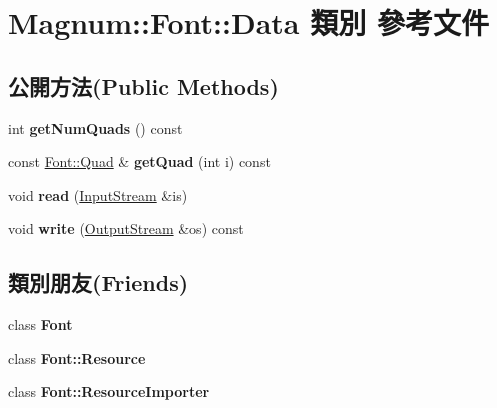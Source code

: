 \hypertarget{class_magnum_1_1_font_1_1_data}{}\section{Magnum\+:\+:Font\+:\+:Data 類別 參考文件}
\label{class_magnum_1_1_font_1_1_data}
\subsection*{公開方法(Public Methods)}
\begin{DoxyCompactItemize}
\item 
int {\bfseries get\+Num\+Quads} () const \hypertarget{class_magnum_1_1_font_1_1_data_a4d13c583437adea6462846e051424389}{}\label{class_magnum_1_1_font_1_1_data_a4d13c583437adea6462846e051424389}

\item 
const \hyperlink{class_magnum_1_1_font_1_1_quad}{Font\+::\+Quad} \& {\bfseries get\+Quad} (int i) const \hypertarget{class_magnum_1_1_font_1_1_data_a6fd9fd60bfb655331a77222a184983fe}{}\label{class_magnum_1_1_font_1_1_data_a6fd9fd60bfb655331a77222a184983fe}

\item 
void {\bfseries read} (\hyperlink{class_magnum_1_1_input_stream}{Input\+Stream} \&is)\hypertarget{class_magnum_1_1_font_1_1_data_a6b1fcfa12684b6bef6709dc16d1c0c77}{}\label{class_magnum_1_1_font_1_1_data_a6b1fcfa12684b6bef6709dc16d1c0c77}

\item 
void {\bfseries write} (\hyperlink{class_magnum_1_1_output_stream}{Output\+Stream} \&os) const \hypertarget{class_magnum_1_1_font_1_1_data_a6bd8d434323ba4560a117d608f63fb43}{}\label{class_magnum_1_1_font_1_1_data_a6bd8d434323ba4560a117d608f63fb43}

\end{DoxyCompactItemize}
\subsection*{類別朋友(Friends)}
\begin{DoxyCompactItemize}
\item 
class {\bfseries Font}\hypertarget{class_magnum_1_1_font_1_1_data_ad564b94b59dc295de3dfc4415d95cca8}{}\label{class_magnum_1_1_font_1_1_data_ad564b94b59dc295de3dfc4415d95cca8}

\item 
class {\bfseries Font\+::\+Resource}\hypertarget{class_magnum_1_1_font_1_1_data_aed1576435da2fd6be67b0972d456c130}{}\label{class_magnum_1_1_font_1_1_data_aed1576435da2fd6be67b0972d456c130}

\item 
class {\bfseries Font\+::\+Resource\+Importer}\hypertarget{class_magnum_1_1_font_1_1_data_adcf31f02b1c16e69102f4d80f9a06dfd}{}\label{class_magnum_1_1_font_1_1_data_adcf31f02b1c16e69102f4d80f9a06dfd}

\end{DoxyCompactItemize}



